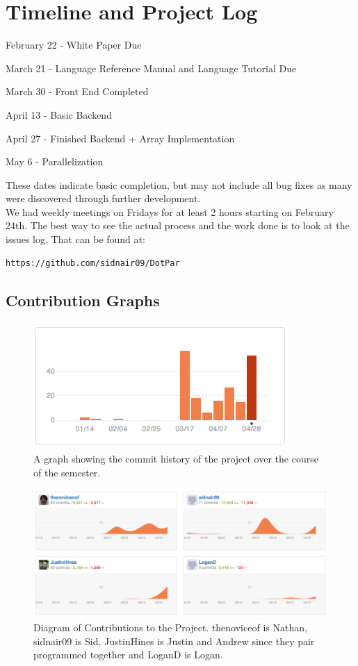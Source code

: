 \section{Timeline and Project Log}
\begin{description}
\item{February 22} - White Paper Due
\item{March 21} - Language Reference Manual and Language Tutorial Due
\item{March 30} - Front End Completed
\item{April 13} - Basic Backend
\item{April 27} - Finished Backend + Array Implementation
\item{May 6} - Parallelization
\end{description}
These dates indicate basic completion, but may not include all bug
fixes as many were discovered through further development.  \\ We had
weekly meetings on Fridays for at least 2 hours starting on February
24th.  The best way to see the actual process and the work done is to
look at the issues log. That can be found at:
\begin{verbatim}
https://github.com/sidnair09/DotPar
\end{verbatim} 
\subsection{Contribution Graphs}
\begin{figure}[H]
\centering
\includegraphics[scale=.5]{history.png}
\caption{A graph showing the commit history of the project over the
  course of the semester.}
\end{figure}

\begin{figure}[H]
\centering
\includegraphics[width=\textwidth]{Contribution.png}
\caption{Diagram of Contributions to the Project. thenoviceof is
  Nathan, sidnair09 is Sid, JustinHines is Justin and Andrew since
  they pair programmed together and LoganD is Logan.}
\end{figure}
